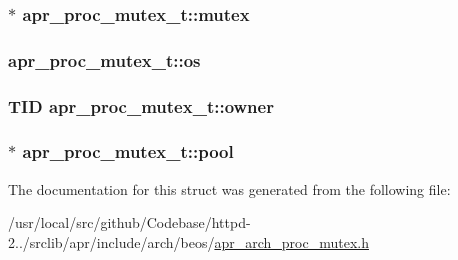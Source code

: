 \subsubsection[{\texorpdfstring{mutex}{mutex}}]{$\ast$ apr\+\_\+proc\+\_\+mutex\+\_\+t\+::mutex}\hypertarget{structapr__proc__mutex__t_a4fb2becb93866ed96a60717a9face2c2}{}\label{structapr__proc__mutex__t_a4fb2becb93866ed96a60717a9face2c2}
\subsubsection[{\texorpdfstring{os}{os}}]{ apr\+\_\+proc\+\_\+mutex\+\_\+t\+::os}\hypertarget{structapr__proc__mutex__t_a7d3bd1d639fd455825caaa338f972e87}{}\label{structapr__proc__mutex__t_a7d3bd1d639fd455825caaa338f972e87}
\subsubsection[{\texorpdfstring{owner}{owner}}]{\setlength{\rightskip}{0pt plus 5cm}T\+ID apr\+\_\+proc\+\_\+mutex\+\_\+t\+::owner}\hypertarget{structapr__proc__mutex__t_adf31e53256e072cfb5e16e7807132fcf}{}\label{structapr__proc__mutex__t_adf31e53256e072cfb5e16e7807132fcf}
\subsubsection[{\texorpdfstring{pool}{pool}}]{ $\ast$ apr\+\_\+proc\+\_\+mutex\+\_\+t\+::pool}\hypertarget{structapr__proc__mutex__t_a2089fc7074e7a09ed1394083230f9707}{}\label{structapr__proc__mutex__t_a2089fc7074e7a09ed1394083230f9707}


The documentation for this struct was generated from the following file\+:\begin{DoxyCompactItemize}
\item 
/usr/local/src/github/\+Codebase/httpd-\/2../srclib/apr/include/arch/beos/\hyperlink{beos_2apr__arch__proc__mutex_8h}{apr\+\_\+arch\+\_\+proc\+\_\+mutex.\+h}\end{DoxyCompactItemize}
